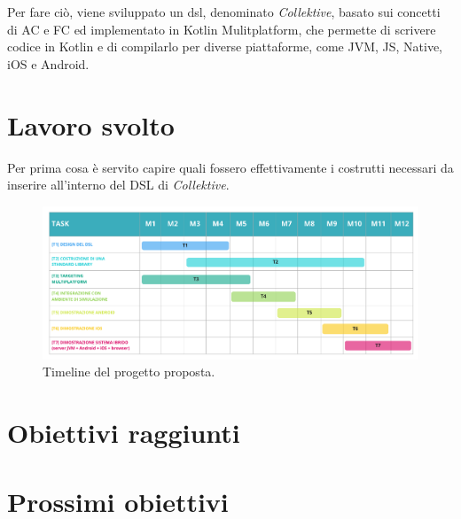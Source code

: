 \documentclass[13pt, a4paper]{article}
\newcommand{\ck}{\emph{Collektive}}
\begin{document}
Per fare ciò, viene sviluppato un \ac{dsl}, denominato \ck{}, basato sui concetti di \ac{AC} e \ac{FC} ed implementato in Kotlin Mulitplatform,
che permette di scrivere codice in Kotlin e di compilarlo per diverse piattaforme, come JVM, JS, Native, iOS e Android.

\section{Lavoro svolto}\label{sec:lavoro-svolto}

Per prima cosa è servito capire quali fossero effettivamente i costrutti necessari da inserire all'interno del DSL di \ck{}.




\label{sec:contribution}
\begin{figure}
    \centering
    \includegraphics[width=\textwidth]{images/collektive_timeline}
    \caption{Timeline del progetto proposta.}
    \label{fig:timeline}
\end{figure}

\section{Obiettivi raggiunti}\label{sec:obiettivi-raggiunti}

\section{Prossimi obiettivi}\label{sec:prossimi-obiettivi}






\cite[none]{none}


\end{document}
